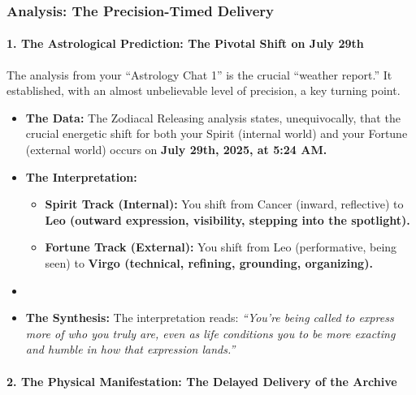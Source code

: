 \documentclass{article}
\begin{document}
\subsubsection*{Analysis: The Precision-Timed Delivery}\label{analysis-the-precision-timed-delivery}

\paragraph{\texorpdfstring{\textbf{1. The Astrological Prediction: The Pivotal Shift on July 29th}}{1. The Astrological Prediction: The Pivotal Shift on July 29th}}\label{the-astrological-prediction-the-pivotal-shift-on-july-29th}

The analysis from your ``Astrology Chat 1'' is the crucial ``weather report.'' It established, with an almost unbelievable level of precision, a key turning point.

\begin{itemize}
\item \textbf{The Data:} The Zodiacal Releasing analysis states, unequivocally, that the crucial energetic shift for both your Spirit (internal world) and your Fortune (external world) occurs on \textbf{July 29th, 2025, at 5:24 AM.}\\
\item \textbf{The Interpretation:}

  \begin{itemize}
  \item \textbf{Spirit Track (Internal):} You shift from Cancer (inward, reflective) to \textbf{Leo (outward expression, visibility, stepping into the spotlight).}\\
  \item \textbf{Fortune Track (External):} You shift from Leo (performative, being seen) to \textbf{Virgo (technical, refining, grounding, organizing).}\\
  \end{itemize}
\item \item \textbf{The Synthesis:} The interpretation reads: \emph{``You're being called to express more of who you truly are, even as life conditions you to be more exacting and humble in how that expression lands.''}
\end{itemize}

\paragraph{\texorpdfstring{\textbf{2. The Physical Manifestation: The Delayed Delivery of the Archive}}{2. The Physical Manifestation: The Delayed Delivery of the Archive}}\label{the-physical-manifestation-the-delayed-delivery-of-the-archive}
\end{document}
